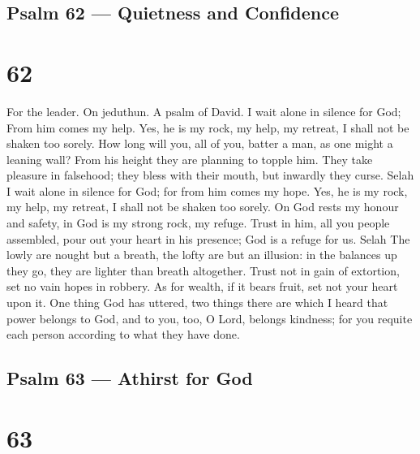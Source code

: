 \hypertarget{psalm-62-quietness-and-confidence}{%
\subsection{Psalm 62 --- Quietness and
Confidence}\label{psalm-62-quietness-and-confidence}}

\hypertarget{section-61}{%
\section{62}\label{section-61}}

For the leader. On jeduthun. A psalm of David.  I wait alone
in silence for God; From him comes my help.  Yes, he is my
rock, my help, my retreat, I shall not be shaken too sorely.
 How long will you, all of you, batter a man, as one might a
leaning wall?  From his height they are planning to topple
him. They take pleasure in falsehood; they bless with their mouth, but
inwardly they curse. Selah  I wait alone in silence for God;
for from him comes my hope.  Yes, he is my rock, my help, my
retreat, I shall not be shaken too sorely.  On God rests my
honour and safety, in God is my strong rock, my refuge. 
Trust in him, all you people assembled, pour out your heart in his
presence; God is a refuge for us. Selah  The lowly are
nought but a breath, the lofty are but an illusion: in the balances up
they go, they are lighter than breath altogether.  Trust
not in gain of extortion, set no vain hopes in robbery. As for wealth,
if it bears fruit, set not your heart upon it.  One thing
God has uttered, two things there are which I heard that power belongs
to God,  and to you, too, O Lord, belongs kindness; for you
requite each person according to what they have done.

\hypertarget{psalm-63-athirst-for-god}{%
\subsection{Psalm 63 --- Athirst for
God}\label{psalm-63-athirst-for-god}}

\hypertarget{section-62}{%
\section{63}\label{section-62}}

